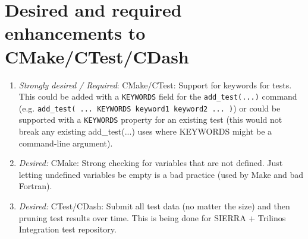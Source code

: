 \documentclass[pdf,ps2pdf,11pt]{SANDreport}
\begin{document}
%
\section{Desired and required enhancements to CMake/CTest/CDash}
%

\begin{enumerate}

{}\item\textit{Strongly desired / Required}: CMake/CTest: Support for
keywords for tests.  This could be added with a {}\texttt{KEYWORDS}
field for the {}\texttt{add\_test(...)} command
(e.g. {}\texttt{add\_test( ... KEYWORDS keyword1 keyword2 ... )}) or
could be supported with a {}\texttt{KEYWORDS} property for an existing
test (this would not break any existing add\_test(...) uses where
KEYWORDS might be a command-line argument).

{}\item\textit{Desired:} CMake: Strong checking for variables that are
not defined.  Just letting undefined variables be empty is a bad
practice (used by Make and bad Fortran).

{}\item\textit{Desired:} CTest/CDash: Submit all test data (no matter
the size) and then pruning test results over time.  This is being done
for SIERRA + Trilinos Integration test repository.

\end{enumerate}



%
\clearpage




\begin{SANDdistribution}[NM]
\end{SANDdistribution}
\end{document}
